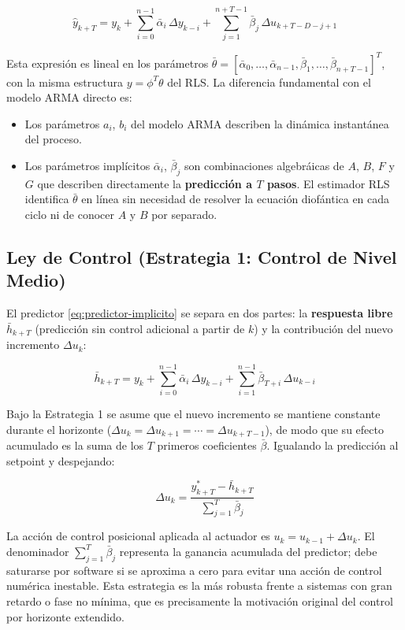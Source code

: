 \begin{equation}
  \hat{y}_{k+T} = y_k + \sum_{i=0}^{n-1}\bar{\alpha}_i\,\Delta y_{k-i}
  + \sum_{j=1}^{n+T-1}\bar{\beta}_j\,\Delta u_{k+T-D-j+1}
  \label{eq:predictor-implicito}
\end{equation}

Esta expresión es lineal en los parámetros $\bar{\theta} = [\bar{\alpha}_0,\ldots,\bar{\alpha}_{n-1},\bar{\beta}_1,\ldots,\bar{\beta}_{n+T-1}]^T$, con la misma estructura $y = \phi^T\theta$ del RLS. La diferencia fundamental con el modelo ARMA directo es:

\begin{itemize}
  \item Los parámetros $a_i$, $b_i$ del modelo ARMA describen la dinámica instantánea del proceso.
  \item Los parámetros implícitos $\bar{\alpha}_i$, $\bar{\beta}_j$ son combinaciones algebráicas de $A$, $B$, $F$ y $G$ que describen directamente la \textbf{predicción a $T$ pasos}. El estimador RLS identifica $\bar{\theta}$ en línea sin necesidad de resolver la ecuación diofántica en cada ciclo ni de conocer $A$ y $B$ por separado.
\end{itemize}

\subsection{Ley de Control (Estrategia 1: Control de Nivel Medio)}

El predictor \eqref{eq:predictor-implicito} se separa en dos partes: la \textbf{respuesta libre} $\bar{h}_{k+T}$ (predicción sin control adicional a partir de $k$) y la contribución del nuevo incremento $\Delta u_k$:

\[
  \bar{h}_{k+T} = y_k + \sum_{i=0}^{n-1}\bar{\alpha}_i\,\Delta y_{k-i}
  + \sum_{i=1}^{n-1}\bar{\beta}_{T+i}\,\Delta u_{k-i}
\]

Bajo la Estrategia 1 se asume que el nuevo incremento se mantiene constante durante el horizonte ($\Delta u_k = \Delta u_{k+1} = \cdots = \Delta u_{k+T-1}$), de modo que su efecto acumulado es la suma de los $T$ primeros coeficientes $\bar{\beta}$. Igualando la predicción al setpoint y despejando:

\begin{equation}
  \Delta u_k = \frac{y^*_{k+T} - \bar{h}_{k+T}}{\displaystyle\sum_{j=1}^{T}\bar{\beta}_j}
  \label{eq:control-horex}
\end{equation}

La acción de control posicional aplicada al actuador es $u_k = u_{k-1} + \Delta u_k$. El denominador $\sum_{j=1}^T\bar{\beta}_j$ representa la ganancia acumulada del predictor; debe saturarse por software si se aproxima a cero para evitar una acción de control numérica inestable. Esta estrategia es la más robusta frente a sistemas con gran retardo o fase no mínima, que es precisamente la motivación original del control por horizonte extendido.
